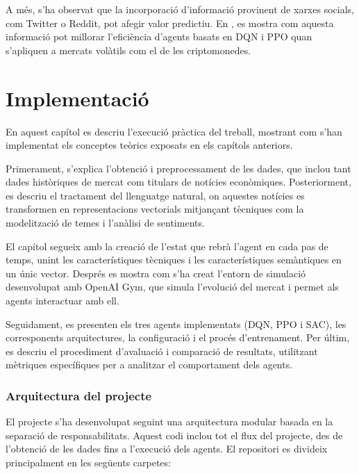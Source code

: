 \documentclass[12pt,a4paper,twoside]{book}
\begin{document}
A més, s'ha observat que la incorporació d'informació provinent de xarxes socials, com Twitter o Reddit, pot afegir valor predictiu. En \cite{DBLP}, es mostra com aquesta informació  pot millorar l'eficiència d'agents basats en DQN i PPO quan s'apliquen a mercats volàtils com el de les criptomonedes.




\chapter{Implementació}

En aquest capítol es descriu l'execució pràctica del treball, mostrant com s'han implementat els conceptes teòrics exposats en els capítols anteriors.

Primerament, s'explica l'obtenció i preprocessament de les dades, que inclou tant dades històriques de mercat com titulars de notícies econòmiques. Posteriorment, es descriu el tractament del llenguatge natural, on aquestes notícies es transformen en representacions vectorials mitjançant tècniques com la modelització de temes i l'anàlisi de sentiments.

El capítol segueix amb la creació de l'estat que rebrà l'agent en cada pas de temps, unint les característiques tècniques i les característiques semàntiques en un únic vector. Després es mostra com s'ha creat l'entorn de simulació desenvolupat amb OpenAI Gym, que simula l'evolució del mercat i permet als agents interactuar amb ell.

Seguidament, es presenten els tres agents implementats (DQN, PPO i SAC), les corresponents arquitectures, la configuració i el procés d'entrenament. Per últim, es descriu el procediment d'avaluació i comparació de resultats, utilitzant mètriques específiques per a analitzar el comportament dels agents.

\subsection{Arquitectura del projecte}
El projecte s'ha desenvolupat seguint una arquitectura modular basada en la separació de responsabilitats. Aquest codi inclou tot el flux del projecte, des de l'obtenció de les dades fins a l'execució dels agents. El repositori es divideix principalment en les següents carpetes:
\end{document}

